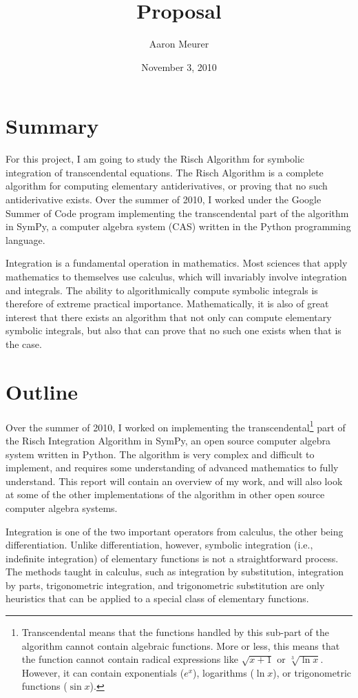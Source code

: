 \documentclass[12pt]{article}
\begin{document}
\title{Proposal}
\author{Aaron Meurer}
\date{November 3, 2010}
\maketitle
\tableofcontents
\section{Summary}
For this project, I am going to study the Risch Algorithm for symbolic
integration of transcendental equations.  The Risch Algorithm is a
complete algorithm for computing elementary antiderivatives, or proving
that no such antiderivative exists.  Over the summer of 2010, I worked
under the Goo\-gle Summer of Code program implementing the
transcendental part of the algorithm in Sym\-Py, a computer algebra
system (CAS) written in the Py\-thon programming language.

Integration is a fundamental operation in mathematics.  Most sciences
that apply mathematics to themselves use calculus, which will invariably
involve integration and integrals.  The ability to algorithmically
compute symbolic integrals is therefore of extreme practical importance.
 Mathematically, it is also of great interest that there exists an
algorithm that not only can compute elementary symbolic integrals, but
also that can prove that no such one exists when that is the case.

\section{Outline}
Over the summer of 2010, I worked on implementing the
transcendental\footnote{Transcendental means that the functions handled
by this sub-part of the algorithm cannot contain algebraic functions.
More or less, this means that the function cannot contain radical
expressions like $\sqrt{x + 1}$ or $\sqrt[3]{\ln{x}}$.  However, it can
contain exponentials ($e^x$), logarithms ($\ln{x}$), or trigonometric
functions ($\sin{x}$).} part of the Risch Integration Algorithm in
Sym\-Py, an open source computer algebra system written in Python.  The
algorithm is very complex and difficult to implement, and requires some
understanding of advanced mathematics to fully understand.  This report
will contain an overview of my work, and will also look at some of the
other implementations of the algorithm in other open source computer
algebra systems.

Integration is one of the two important operators from calculus, the
other being differentiation.  Unlike differentiation, however, symbolic
integration (i.e., indefinite integration) of elementary functions is
not a straightforward process. The methods taught in calculus, such as
integration by substitution, integration by parts, trigonometric
integration, and trigonometric substitution are only heuristics that can
be applied to a special class of elementary functions.  
\end{document}

